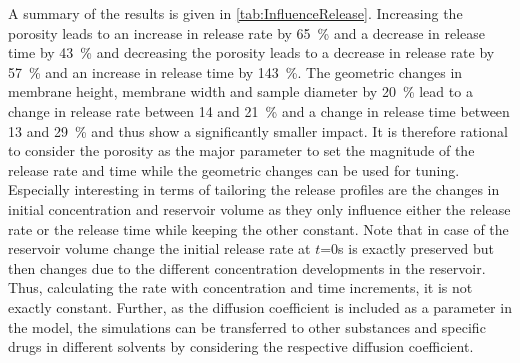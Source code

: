 A summary of the results is given in \cref{tab:InfluenceRelease}. Increasing the porosity leads to an increase in release rate by 65~\% and a decrease in release time by 43~\% and decreasing the porosity leads to a decrease in release rate by 57~\% and an increase in release time by 143~\%. The geometric changes in membrane height, membrane width and sample diameter by 20~\% lead to a change in release rate between 14 and 21~\% and a change in release time between 13 and 29~\% and thus show a significantly smaller impact. It is therefore rational to consider the porosity as the major parameter to set the magnitude of the release rate and time while the geometric changes can be used for tuning. Especially interesting in terms of tailoring the release profiles are the changes in initial concentration and reservoir volume as they only influence either the release rate or the release time while keeping the other constant. Note that in case of the reservoir volume change the initial release rate at $t$=0s is exactly preserved but then changes due to the different concentration developments in the reservoir. Thus, calculating the rate with concentration and time increments, it is not exactly constant. Further, as the diffusion coefficient is included as a parameter in the model, the simulations can be transferred to other substances and specific drugs in different solvents by considering the respective diffusion coefficient.
